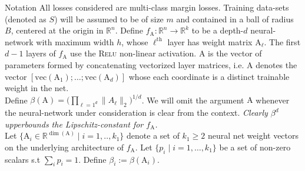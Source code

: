 \documentclass[final,t]{beamer}
\newcommand\R{\mathbb{R}}
\newcommand{\norm}[2][]{#1\lVert #2 #1\rVert}
\newcommand{\A}{\textrm{A}}
\begin{document}
\begin{frame}[containsverbatim]
\begin{columns}[t]
\begin{column}{.32\linewidth}


    \begin{exampleblock}{Notation}
    All losses considered are multi-class margin losses. Training data-sets (denoted as $S$) will be assumed to be of size $m$ and contained in a ball of radius $B$, centered at the origin in $\R^n$.
    Define $f_{\A}: \R^n \to \R^k$ to be a depth-$d$ neural-network with maximum width $h$, whose $\ell^\text{th}$ layer has weight matrix $\A_\ell$. The first $d-1$ layers of $f_{\A}$ use the \textsc{Relu} non-linear activation. $\A$ is the vector of parameters formed by concatenating vectorized layer matrices, i.e. $\A$ denotes the vector $[\mathrm{vec}(\A_1); \ldots; \mathrm{vec}(\A_d)]$ whose each coordinate is a distinct trainable weight in the net.
    \newline \\
    Define $\beta(\A) = \big ( \prod\nolimits_{\ell=1}\nolimits^d \norm{A_\ell}_2 \big )^{1/d}$. We will omit the argument $\A$ whenever the neural-network under consideration is clear from the context. {\it Clearly $\beta^d$ upperbounds the Lipschitz-constant for $f_{\A}$.}
    \newline \\ 
    Let $\{ {\A}_i \in \R^{\dim(\A)} \mid  i=1,..,k_1 \}$ denote a set of $k_1 \geq 2$ neural net weight vectors on the underlying architecture of $f_{\A}$. Let $\{p_i \mid i=1, \ldots, k_1\}$ be a set of non-zero scalars s.t $\sum_i p_i = 1$. Define $\beta_i := \beta(\A_i)$.  
   \end{exampleblock}
   

\end{column}
\end{columns}
\end{frame}
\end{document}
